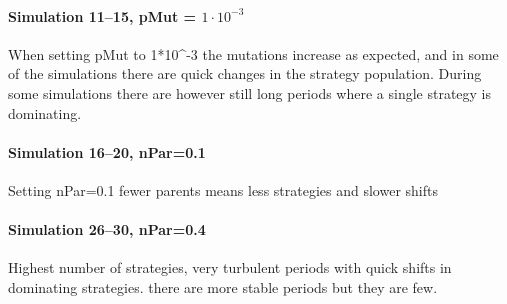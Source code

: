 

\paragraph{Simulation 11--15, pMut = $1\cdot 10^{-3}$}
When setting pMut to 1*10^-3 the mutations increase as expected, and in some of the simulations there are quick changes in the strategy population. During some simulations there are however still long periods where a single strategy is dominating.



\paragraph{Simulation 16--20, nPar=0.1}
Setting nPar=0.1 fewer parents means less strategies and slower shifts



\paragraph{Simulation 26--30, nPar=0.4}
Highest number of strategies, very turbulent periods with quick shifts in dominating strategies. there are more stable periods but they are few.

 

